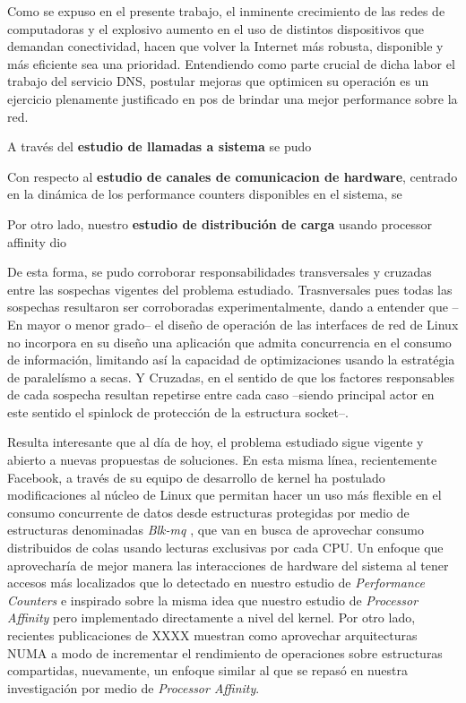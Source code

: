 \begin{conclusion}

Como se expuso en el presente trabajo, el inminente crecimiento de las redes de computadoras y el explosivo aumento en el uso de distintos dispositivos que demandan conectividad, hacen que volver la Internet más robusta, disponible y más eficiente sea una prioridad. Entendiendo como parte crucial de dicha labor el trabajo del servicio DNS, postular mejoras que optimicen su operación es un ejercicio plenamente justificado en pos de brindar una mejor performance sobre la red.

A través del \textbf{estudio de llamadas a sistema} se pudo

Con respecto al \textbf{estudio de canales de comunicacion de hardware}, centrado en la dinámica de los performance counters disponibles en el sistema, se

Por otro lado, nuestro \textbf{estudio de distribución de carga} usando processor affinity dio

De esta forma, se pudo corroborar responsabilidades transversales y cruzadas entre las sospechas vigentes del problema estudiado. Trasnversales pues todas las sospechas resultaron ser corroboradas experimentalmente, dando a entender que --En mayor o menor grado-- el diseño de operación de las interfaces de red de Linux no incorpora en su diseño una aplicación que admita concurrencia en el consumo de información, limitando así la capacidad de optimizaciones usando la estratégia de paralelísmo a secas. Y Cruzadas, en el sentido de que los factores responsables de cada sospecha resultan repetirse entre cada caso --siendo principal actor en este sentido el spinlock de protección de la estructura socket--.

Resulta interesante que al día de hoy, el problema estudiado sigue vigente y abierto a nuevas propuestas de soluciones. En esta misma línea, recientemente Facebook, a través de su equipo de desarrollo de kernel ha postulado modificaciones al núcleo de Linux que permitan hacer un uso más flexible en el consumo concurrente de datos desde estructuras protegidas por medio de estructuras denominadas \emph{Blk-mq} \cite{post:facebookFin}, que van en busca de aprovechar consumo distribuidos de colas usando lecturas exclusivas por cada CPU. Un enfoque que aprovecharía de mejor manera las interacciones de hardware del sistema al tener accesos más localizados que lo detectado en nuestro estudio de \emph{Performance Counters} e inspirado sobre la misma idea que nuestro estudio de \emph{Processor Affinity} pero implementado directamente a nivel del kernel. Por otro lado, recientes publicaciones de XXXX muestran como aprovechar arquitecturas NUMA a modo de incrementar el rendimiento de operaciones sobre estructuras compartidas, nuevamente, un enfoque similar al que se repasó en nuestra investigación por medio de \emph{Processor Affinity}.


\end{conclusion}
